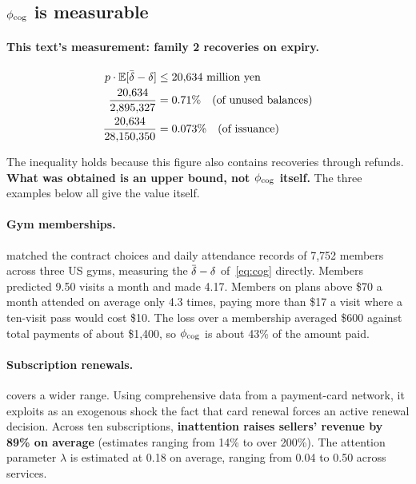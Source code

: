 \subsection{\texorpdfstring{$\phi_{\rm cog}$}{phi-cog} is measurable}
\label{sec:phicog-measurable}

\paragraph{This text's measurement: family 2 recoveries on expiry.}

\begin{align}
p\cdot\E[\dbar-\delta] &\leq 20{,}634\ \text{million yen}\\
\frac{20{,}634}{2{,}895{,}327} &= 0.71\%\quad\text{(of unused balances)}\\
\frac{20{,}634}{28{,}150{,}350} &= 0.073\%\quad\text{(of issuance)}
\end{align}

The inequality holds because this figure also contains recoveries through refunds.
\textbf{What was obtained is an upper bound, not $\phi_{\rm cog}$ itself.}
The three examples below all give the value itself.

\paragraph{Gym memberships.}

\cite{dellavigna2006} matched the contract choices and daily attendance records of 7{,}752
members across three US gyms, measuring the $\dbar-\delta$ of~\eqref{eq:cog} directly.
Members predicted 9.50 visits a month and made 4.17. Members on plans above \$70 a month
attended on average only 4.3 times, paying more than \$17 a visit where a ten-visit pass
would cost \$10. The loss over a membership averaged \$600 against total payments of about
\$1{,}400, so $\phi_{\rm cog}$ is about 43\% of the amount paid.

\paragraph{Subscription renewals.}

\cite{einav2025} covers a wider range. Using comprehensive data from a payment-card network,
it exploits as an exogenous shock the fact that card renewal forces an active renewal
decision. Across ten subscriptions, \textbf{inattention raises sellers' revenue by 89\% on
average} (estimates ranging from 14\% to over 200\%). The attention parameter $\lambda$ is
estimated at 0.18 on average, ranging from 0.04 to 0.50 across services.


